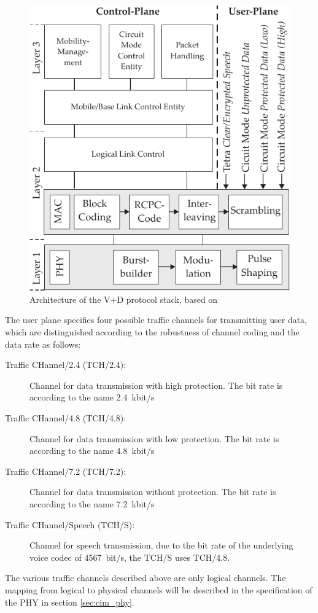 \begin{figure}[htb]
	\centering
		\includegraphics[]{../kapitel04/figures/architecture_VD.pdf}
	\caption{Architecture of the V+D protocol stack, based on \cite{Steppler}}
	\label{fig:architecture_VD}
\end{figure}

The user plane specifies four possible traffic channels for transmitting user data, which are distinguished according to the robustness of channel coding and the data rate as follows:
		\begin{description}
 	 		\item [Traffic CHannel/2.4 (TCH/2.4):]
				Channel for data transmission with high protection. The bit rate is according to the name \SI{2.4}{kbit/s}

 	 		\item [Traffic CHannel/4.8 (TCH/4.8):]
				Channel for data transmission with low protection. The bit rate is according to the name \SI{4.8}{kbit/s}
			
			\item [Traffic CHannel/7.2 (TCH/7.2):]
 				Channel for data transmission without protection. The bit rate is according to the name \SI{7.2}{kbit/s}

			\item [Traffic CHannel/Speech (TCH/S):]
			  Channel for speech transmission, due to the bit rate of the underlying voice codec of \SI{4567}{bit/s}, the TCH/S uses TCH/4.8.
		\end{description}
The various traffic channels described above are only logical channels. The mapping from logical to physical channels will be described in the specification of the \ac{PHY} in section \ref{sec:cim_phy}.
		
